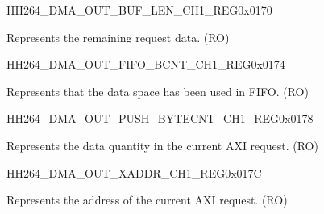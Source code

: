 \begin{register}{H}{H264\_DMA\_OUT\_BUF\_LEN\_CH1\_REG}{0x0170}\label{regdesc:H264DMAOUTBUFLENCH1REG}
%
%
\regnewline%
\begin{regdesc}\begin{reglist}
\label{fielddesc:H264DMAOUTCMDFIFOBUFLENHBCH1}\item [H264\_DMA\_OUT\_CMDFIFO\_BUF\_LEN\_HB\_CH1] Represents the remaining request data. (RO)
\end{reglist}\end{regdesc}
\end{register}


\begin{register}{H}{H264\_DMA\_OUT\_FIFO\_BCNT\_CH1\_REG}{0x0174}\label{regdesc:H264DMAOUTFIFOBCNTCH1REG}
%
%
\regnewline%
\begin{regdesc}\begin{reglist}
\label{fielddesc:H264DMAOUTCMDFIFOOUTFIFOBCNTCH1}\item [H264\_DMA\_OUT\_CMDFIFO\_OUTFIFO\_BCNT\_CH1] Represents that the data space has been used in FIFO. (RO)
\end{reglist}\end{regdesc}
\end{register}


\begin{register}{H}{H264\_DMA\_OUT\_PUSH\_BYTECNT\_CH1\_REG}{0x0178}\label{regdesc:H264DMAOUTPUSHBYTECNTCH1REG}
%
%
\regnewline%
\begin{regdesc}\begin{reglist}
\label{fielddesc:H264DMAOUTCMDFIFOPUSHBYTECNTCH1}\item [H264\_DMA\_OUT\_CMDFIFO\_PUSH\_BYTECNT\_CH1] Represents the data quantity in the current AXI request. (RO)
\end{reglist}\end{regdesc}
\end{register}


\begin{register}{H}{H264\_DMA\_OUT\_XADDR\_CH1\_REG}{0x017C}\label{regdesc:H264DMAOUTXADDRCH1REG}
%
\regnewline%
\begin{regdesc}\begin{reglist}
\label{fielddesc:H264DMAOUTCMDFIFOXADDRCH1}\item [H264\_DMA\_OUT\_CMDFIFO\_XADDR\_CH1] Represents the address of the current AXI request. (RO)
\end{reglist}\end{regdesc}
\end{register}

